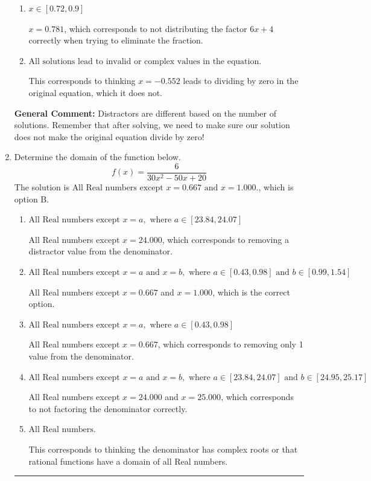 \documentclass{extbook}[14pt]
\newcommand{\litem}[1]{\item #1

\rule{\textwidth}{0.4pt}}
\begin{document}
\begin{enumerate}
{\begin{enumerate}[label=\Alph*.]
$x = -0.552 \text{ and } x = 0.781$, which corresponds to getting the correct solution and believing there should be a second solution to the equation.
\item \( x \in [0.72,0.9] \)

$x = 0.781$, which corresponds to not distributing the factor $6x + 4$ correctly when trying to eliminate the fraction.
\item \( \text{All solutions lead to invalid or complex values in the equation.} \)

This corresponds to thinking $x = -0.552$ leads to dividing by zero in the original equation, which it does not.
\end{enumerate}

\textbf{General Comment:} Distractors are different based on the number of solutions. Remember that after solving, we need to make sure our solution does not make the original equation divide by zero!
}
\litem{
Determine the domain of the function below.
\[ f(x) = \frac{6}{30x^{2} -50 x + 20} \]The solution is \( \text{All Real numbers except } x = 0.667 \text{ and } x = 1.000. \), which is option B.\begin{enumerate}[label=\Alph*.]
\item \( \text{All Real numbers except } x = a, \text{ where } a \in [23.84, 24.07] \)

All Real numbers except $x = 24.000$, which corresponds to removing a distractor value from the denominator.
\item \( \text{All Real numbers except } x = a \text{ and } x = b, \text{ where } a \in [0.43, 0.98] \text{ and } b \in [0.99, 1.54] \)

All Real numbers except $x = 0.667$ and $x = 1.000$, which is the correct option.
\item \( \text{All Real numbers except } x = a, \text{ where } a \in [0.43, 0.98] \)

All Real numbers except $x = 0.667$, which corresponds to removing only 1 value from the denominator.
\item \( \text{All Real numbers except } x = a \text{ and } x = b, \text{ where } a \in [23.84, 24.07] \text{ and } b \in [24.95, 25.17] \)

All Real numbers except $x = 24.000$ and $x = 25.000$, which corresponds to not factoring the denominator correctly.
\item \( \text{All Real numbers.} \)

This corresponds to thinking the denominator has complex roots or that rational functions have a domain of all Real numbers.
\end{enumerate}

}
\end{enumerate}
\end{document}
